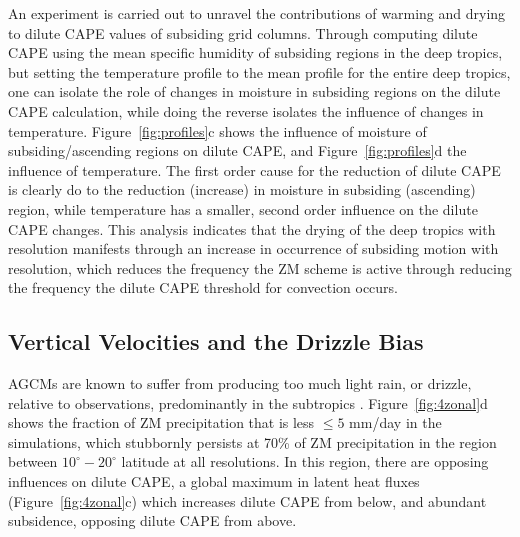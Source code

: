 \documentclass[times]{qjrms4}
\begin{document}
An experiment is carried out to unravel the contributions of warming and drying to dilute CAPE values of subsiding grid columns. Through computing dilute CAPE using the mean specific humidity of subsiding regions in the deep tropics, but setting the temperature profile to the mean profile for the entire deep tropics, one can isolate the role of changes in moisture in subsiding regions on the dilute CAPE calculation, while doing the reverse isolates the influence of changes in temperature. Figure~\ref{fig:profiles}c shows the influence of moisture of subsiding/ascending regions on dilute CAPE, and Figure~\ref{fig:profiles}d the influence of temperature. The first order cause for the reduction of dilute CAPE is clearly do to the reduction (increase) in moisture in subsiding (ascending) region, while temperature has a smaller, second order influence on the dilute CAPE changes. This analysis indicates that the drying of the deep tropics with resolution manifests through an increase in occurrence of subsiding motion with resolution, which reduces the frequency the ZM scheme is active through reducing the frequency the dilute CAPE threshold for convection occurs.

\subsection{Vertical Velocities and the Drizzle Bias}

AGCMs are known to suffer from producing too much light rain, or drizzle, relative to observations, predominantly in the subtropics \citep{D2006JCLIM}. Figure~\ref{fig:4zonal}d shows the fraction of ZM precipitation that is less $\leq 5$ mm/day in the simulations, which stubbornly persists at 70\% of ZM precipitation in the region between $10^{\circ}-20^{\circ}$ latitude at all resolutions. In this region, there are opposing influences on dilute CAPE, a global maximum in latent heat fluxes (Figure~\ref{fig:4zonal}c) which increases dilute CAPE from below, and abundant subsidence, opposing dilute CAPE from above.

\end{document}
